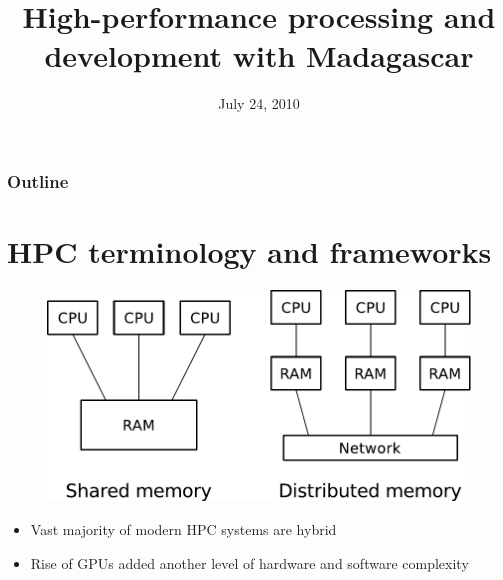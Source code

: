 \newcommand{\ccode}[4]
{
  \begin{block}{#3}
  
  \end{block}
}
%
%
\title[]{High-performance processing and development with Madagascar}

\date[Madagascar school in Houston] %
{July 24, 2010}

\begin{frame}
  \titlepage
  \appendix
\end{frame}

\begin{frame}
  \frametitle{Outline}
   \hspace*{2cm}
   \begin{minipage}[t][4.5cm]{10cm}
    \tableofcontents
   \end{minipage}
\end{frame}

\section{HPC terminology and frameworks}

\begin{frame}
  \begin{figure}
  \includegraphics[scale=0.65]{Fig/hpc.pdf}
  \end{figure}
  \begin{block}{}
    \begin{itemize}
      \item Vast majority of modern HPC systems are hybrid
      \item Rise of GPUs added another level of hardware and software complexity
    \end{itemize}
  \end{block}
\end{frame}


